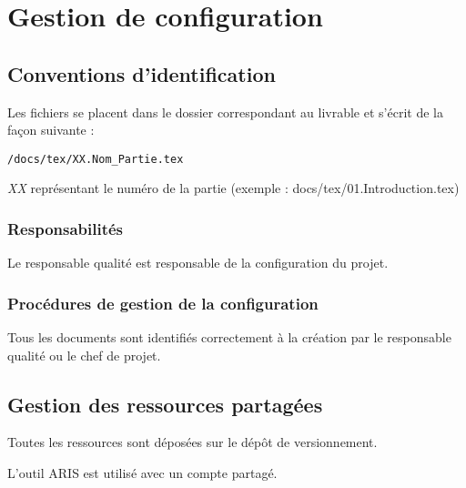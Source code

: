 \section{Gestion de configuration}

\subsection{Conventions d'identification}
Les fichiers se placent dans le dossier correspondant au livrable et
s'écrit de la façon suivante : 
\begin{verbatim}/docs/tex/XX.Nom_Partie.tex\end{verbatim}
\textsl{XX} représentant le numéro de la partie
(exemple : docs/tex/01.Introduction.tex)

\subsubsection{Responsabilités}
Le responsable qualité est responsable de la configuration du projet.

\subsubsection{Procédures de gestion de la configuration}
Tous les documents sont identifiés correctement à la création par le
responsable qualité ou le chef de projet.

\subsection{Gestion des ressources partagées}
Toutes les ressources sont déposées sur le dépôt de versionnement.

L'outil ARIS est utilisé avec un compte partagé.
